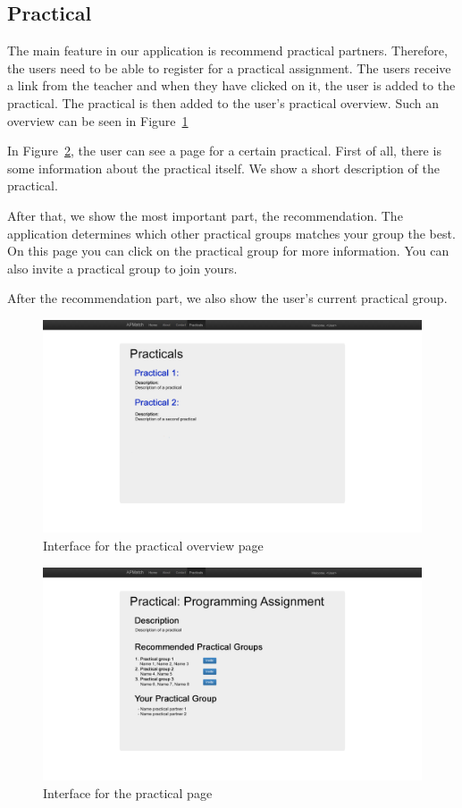 \subsection{Practical}
The main feature in our application is recommend practical partners.
Therefore, the users need to be able to register for a practical assignment.
The users receive a link from the teacher and when they have clicked on it, the user is added to the practical.
The practical is then added to the user's practical overview.
Such an overview can be seen in Figure~\ref{mockup_practical_overview}

In Figure~\ref{mockup_practical}, the user can see a page for a certain practical.
First of all, there is some information about the practical itself.
We show a short description of the practical.

After that, we show the most important part, the recommendation.
The application determines which other practical groups matches your group the best.
On this page you can click on the practical group for more information.
You can also invite a practical group to join yours.

After the recommendation part, we also show the user's current practical group.


\begin{figure}[H]
    \centering
    \captionsetup{justification=centering}
    \includegraphics[width=\textwidth, frame]{images/mockup_practical_overview}
    \caption{Interface for the practical overview page}
    \label{mockup_practical_overview}
\end{figure}

\begin{figure}[H]
    \centering
    \captionsetup{justification=centering}
    \includegraphics[width=\textwidth, frame]{images/mockup_practical}
    \caption{Interface for the practical page}
    \label{mockup_practical}
\end{figure}
